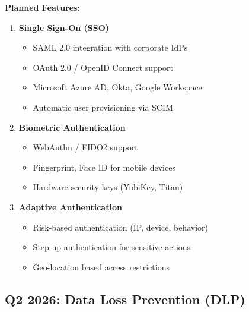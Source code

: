 \textbf{Planned Features:}
\begin{enumerate}
    \item \textbf{Single Sign-On (SSO)}
    \begin{itemize}
        \item SAML 2.0 integration with corporate IdPs
        \item OAuth 2.0 / OpenID Connect support
        \item Microsoft Azure AD, Okta, Google Workspace
        \item Automatic user provisioning via SCIM
    \end{itemize}
    
    \item \textbf{Biometric Authentication}
    \begin{itemize}
        \item WebAuthn / FIDO2 support
        \item Fingerprint, Face ID for mobile devices
        \item Hardware security keys (YubiKey, Titan)
    \end{itemize}
    
    \item \textbf{Adaptive Authentication}
    \begin{itemize}
        \item Risk-based authentication (IP, device, behavior)
        \item Step-up authentication for sensitive actions
        \item Geo-location based access restrictions
    \end{itemize}
\end{enumerate}

\subsection{Q2 2026: Data Loss Prevention (DLP)}

